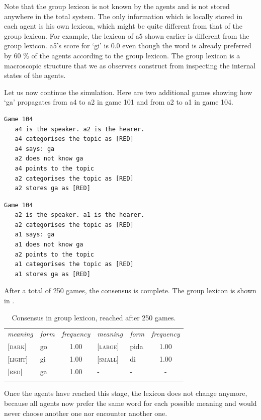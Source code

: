 Note that the group lexicon is not known by the agents
and is not stored anywhere in the 
total system. The only information which is locally stored in each 
agent is his own lexicon, which might be quite different from that 
of the group lexicon. For example, the lexicon of {\bfshape a5} shown earlier
is different from the group lexicon.
{\bfshape a5}'s score for `gi' is 0.0
even though the word is already preferred by 60 \% of 
the agents according to the group lexicon. 
The group lexicon is a macroscopic structure that we
as observers construct from inspecting the internal 
states of the agents. 

Let us now continue the simulation. Here are two additional
games showing how `ga' propagates from {\bfshape a4} to {\bfshape a2} in 
game 101 and from {\bfshape a2} to {\bfshape a1} in game 104. 
\begin{verbatim}
Game 104
   a4 is the speaker. a2 is the hearer. 
   a4 categorises the topic as [RED]
   a4 says: ga
   a2 does not know ga
   a4 points to the topic
   a2 categorises the topic as [RED]
   a2 stores ga as [RED]
\end{verbatim}
\begin{verbatim}
Game 104
   a2 is the speaker. a1 is the hearer. 
   a2 categorises the topic as [RED]
   a1 says: ga
   a1 does not know ga
   a2 points to the topic
   a1 categorises the topic as [RED]
   a1 stores ga as [RED]
\end{verbatim}
After a total of 250 games, the consensus is complete. 
The group lexicon is shown in . 

\begin{table}
\begin{center}
\begin{tabular}{l  l  c  l  l  c } \midrule 
{\itshape meaning} & {\itshape form} & {\itshape frequency} & {\itshape meaning} & {\itshape form} & {\itshape frequency}\\  
{}[\textsc{dark}]& go & 1.00 & [\textsc{large}]& pida & 1.00 \\  
{}[\textsc{light}]& gi & 1.00 & [\textsc{small}]& di & 1.00 \\  
{}[\textsc{red}]& ga & 1.00 & - & - & -  \\  
\lspbottomrule
\end{tabular}
\caption{\label{tab:t-mem5}Consensus in group lexicon, reached after 250 games.}
\end{center}
\end{table}
Once the agents have reached this stage, the lexicon does not 
change anymore, because all agents now prefer the same word for 
each possible meaning and would never choose another one
nor encounter another one. 

